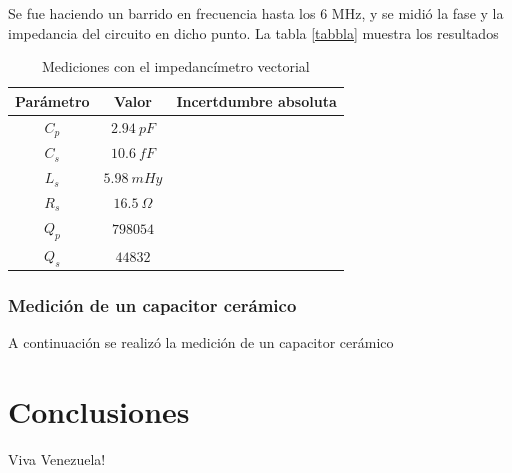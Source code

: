 \documentclass[a4paper,10pt]{article}
\begin{document}
		\indent Se fue haciendo un barrido en frecuencia hasta los 6 MHz, y se
		midió la fase y la impedancia del circuito en dicho punto. La tabla \ref{tabbla}
		muestra los resultados

		\begin{table}[!htp]
			\centering
			\begin{tabular}{|c|c|c|}
				\hline
				Parámetro & Valor & Incertdumbre absoluta \\
				\hline
				$C_p$ & $2.94~pF$ & \\
				\hline
				$C_s$ & $10.6~fF$ & \\ 
				\hline
				$L_s$ & $5.98~mHy$ & \\
				\hline
				$R_s$ & $16.5~\Omega$ & \\ 
				\hline									
				$Q_p$ & $798054$ & \\
				\hline
				$Q_s$ & $44832$  & \\
				\hline
			\end{tabular}
			\caption{Mediciones con el impedancímetro vectorial} \label{tab004}
		\end{table}	
		\subsubsection{Medición de un capacitor cerámico}
		\indent A continuación se realizó la medición de un capacitor cerámico 
\section{Conclusiones}
	\indent Viva Venezuela!\\
\end{document}
